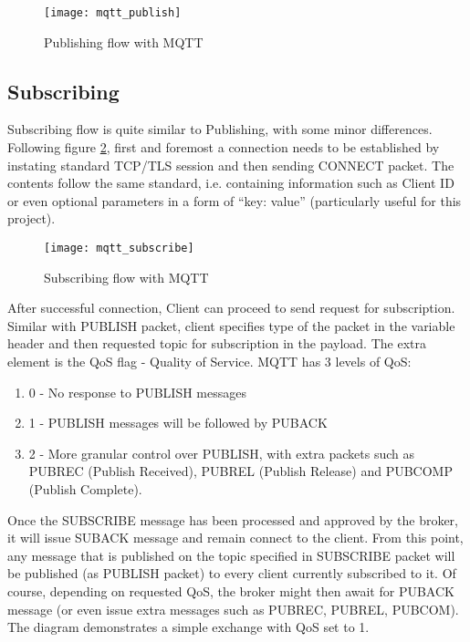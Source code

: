 \begin{figure}[ht]
    \centering
    \texttt{[image: mqtt\_publish]}
    \caption{Publishing flow with MQTT}
    \label{fig:mqtt_publish}
\end{figure}


\subsection{Subscribing}

Subscribing flow is quite similar to Publishing, with some minor differences. Following figure \ref{fig:mqtt_subscribe}, first and foremost a connection needs to be established by instating standard TCP/TLS session and then sending CONNECT packet. The contents follow the same standard, i.e. containing information such as Client ID or even optional parameters in a form of ``key: value'' (particularly useful for this project).

\begin{figure}[ht]
    \centering
    \texttt{[image: mqtt\_subscribe]}
    \caption{Subscribing flow with MQTT}
    \label{fig:mqtt_subscribe}
\end{figure}

After successful connection, Client can proceed to send request for subscription. Similar with PUBLISH packet, client specifies type of the packet in the variable header and then requested topic for subscription in the payload. The extra element is the QoS flag - Quality of Service. MQTT has 3 levels of QoS:
\begin{enumerate}
  \item 0 - No response to PUBLISH messages
  \item 1 - PUBLISH messages will be followed by PUBACK
  \item 2 - More granular control over PUBLISH, with extra packets such as PUBREC (Publish Received), PUBREL (Publish Release) and PUBCOMP (Publish Complete).
\end{enumerate}

Once the SUBSCRIBE message has been processed and approved by the broker, it will issue SUBACK message and remain connect to the client. From this point, any message that is published on the topic specified in SUBSCRIBE packet will be published (as PUBLISH packet) to every client currently subscribed to it. Of course, depending on requested QoS, the broker might then await for PUBACK message (or even issue extra messages such as PUBREC, PUBREL, PUBCOM). The diagram demonstrates a simple exchange with QoS set to 1. 

